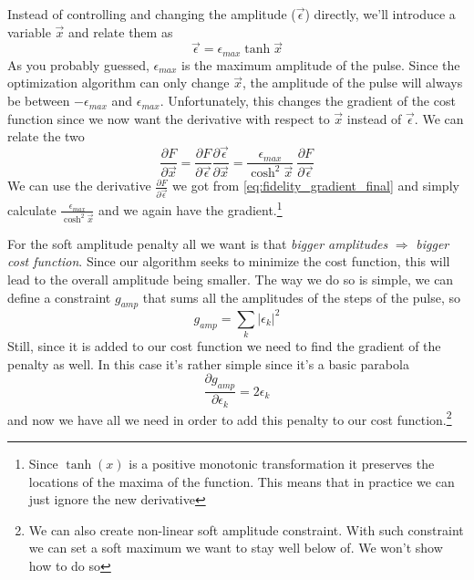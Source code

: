 Instead of controlling and changing the amplitude ($\vec{\epsilon}$) directly, we'll introduce a variable $\vec{x}$ and relate them as
\[
    \vec{\epsilon} = \epsilon_{max}\tanh{\vec{x}}
\]
As you probably guessed, $\epsilon_{max}$ is the maximum amplitude of the pulse.
Since the optimization algorithm can only change $\vec{x}$, the amplitude of the pulse will always be between $-\epsilon_{max}$ and $\epsilon_{max}$. Unfortunately, this changes the gradient of the cost function since we now want the derivative with respect to $\vec{x}$ instead of $\vec{\epsilon}$. We can relate the two
\[
\frac{\partial F}{\partial \vec{x}} = \frac{\partial F}{\partial \vec{\epsilon}}\frac{\partial \vec{\epsilon}}{\partial \vec{x}} = \frac{\epsilon_{max}}{\cosh^2{\vec{x}}} \ \frac{\partial F}{\partial \vec{\epsilon}}
\]
We can use the derivative $\frac{\partial F}{\partial \vec{\epsilon}}$ we got from \ref{eq:fidelity_gradient_final} and simply calculate $\frac{\epsilon_{max}}{\cosh^2{\vec{x}}}$ and we again have the gradient.\footnote{Since $\tanh (x)$ is a positive monotonic transformation it preserves the locations of the maxima of the function. This means that in practice we can just ignore the new derivative}

For the soft amplitude penalty all we want is that \textit{bigger amplitudes} $\Rightarrow$ \textit{bigger cost function}. Since our algorithm seeks to minimize the cost function, this will lead to the overall amplitude being smaller. The way we do so is simple, we can define a constraint $g_{amp}$ that sums all the amplitudes of the steps of the pulse, so
\[
    g_{amp} = \sum_k |\epsilon_k|^2
\]
Still, since it is added to our cost function we need to find the gradient of the penalty as well. In this case it's rather simple since it's a basic parabola
\[
    \frac{\partial g_{amp}}{\partial \epsilon_k} = 2\epsilon_k
\]
and now we have all we need in order to add this penalty to our cost function.\footnote{We can also create non-linear soft amplitude constraint. With such constraint we can set a soft maximum we want to stay well below of. We won't show how to do so}%

